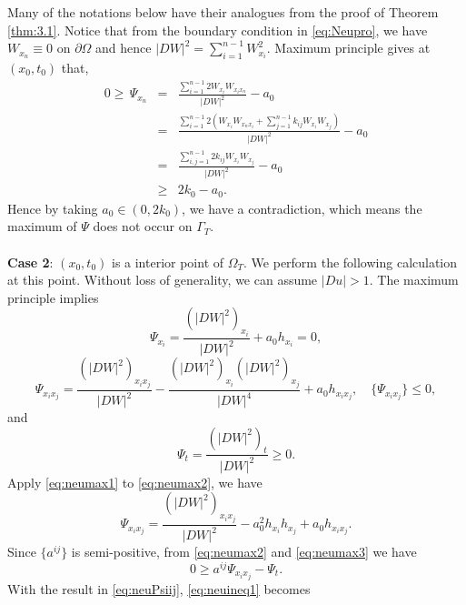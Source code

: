 \documentclass[12pt]{article}
\numberwithin{equation}{section}
\theoremstyle{plain}
\theoremstyle{definition}
\theoremstyle{remark}
\begin{document}
Many of the notations below have their analogues from the proof of Theorem \ref{thm:3.1}. Notice that from the boundary condition in \eqref{eq:Neupro}, we have $W_{x_n} \equiv 0$ on $\partial\Omega$ and hence $|DW|^2 = \sum_{i=1}^{n-1} W_{x_i}^2 $. Maximum principle gives  at $(x_0,t_0)$ that,
\begin{eqnarray*}
    0 \geq \,\Psi_{x_n} &=&
    \frac{ \sum_{i=1}^{n-1} 2W_{x_i} W_{x_i x_n} }{|DW|^2} - a_0 \\
   &= & \frac{ \sum_{i=1}^{n-1} 2 \left(  W_{x_i} W_{x_n x_i} + \sum_{j=1}^{n-1} k_{ij} W_{x_i} W_{x_j}  \right) }{|DW|^2} - a_0 \\
   &= & \frac{ \sum_{i,j=1}^{n-1} 2  k_{ij} W_{x_i} W_{x_j}   }{|DW|^2} - a_0 \\
   &\geq & 2 k_0 - a_0.
\end{eqnarray*}
Hence by taking $a_0 \in (0,2k_0)$, we have a contradiction, which means the maximum of $\Psi$ does not occur on $\Gamma_T$. \\ \\
\textbf{Case 2}: $(x_0,t_0)$ is a interior point of $\Omega_T$. We perform the following calculation at this point. Without loss of generality, we can assume $|Du|>1$. The maximum principle implies
\begin{equation} \label{eq:neumax1}
    \Psi_{x_i} = \frac{\left(|DW|^2\right)_{x_i}}{|DW|^2} + a_0 h_{x_i} = 0,
\end{equation}
\begin{equation}  \label{eq:neumax2}
    \Psi_{x_i x_j} = \frac{\left(|DW|^2 \right)_{x_i x_j}}{|DW|^2} - \frac{\left(|DW|^2 \right)_{x_i} \left(|DW|^2 \right)_{x_j}}{|DW|^4} + a_0 h_{x_i x_j}, \quad \{ \Psi_{x_i x_j} \} \leq 0,
\end{equation}
and
\begin{equation} \label{eq:neumax3}
    \Psi_t = \frac{\left(|DW|^2 \right)_t}{|DW|^2} \geq 0.
\end{equation}
Apply \eqref{eq:neumax1} to \eqref{eq:neumax2}, we have
\begin{equation}  \label{eq:neuPsiij}
    \Psi_{x_i x_j} = \frac{\left(|DW|^2 \right)_{x_i x_j}}{|DW|^2} - a_0^2 h_{x_i} h_{x_j} + a_0 h_{x_i x_j}.
\end{equation}
Since $\{a^{ij}\}$ is semi-positive, from \eqref{eq:neumax2} and \eqref{eq:neumax3} we have 
\begin{equation} \label{eq:neuineq1}
     0 \geq a^{ij} \Psi_{x_i x_j} - \Psi_t.
\end{equation}
With the result in \eqref{eq:neuPsiij}, \eqref{eq:neuineq1} becomes
\end{document}
